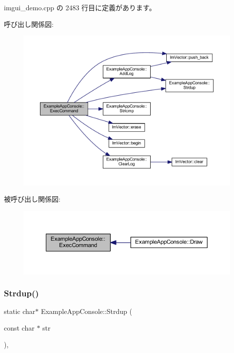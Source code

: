  imgui\+\_\+demo.\+cpp の 2483 行目に定義があります。

呼び出し関係図\+:\nopagebreak
\begin{figure}[H]
\begin{center}
\leavevmode
\includegraphics[width=350pt]{struct_example_app_console_aa1e8bf1f3795cbc41597e1ff081c6589_cgraph}
\end{center}
\end{figure}
被呼び出し関係図\+:\nopagebreak
\begin{figure}[H]
\begin{center}
\leavevmode
\includegraphics[width=350pt]{struct_example_app_console_aa1e8bf1f3795cbc41597e1ff081c6589_icgraph}
\end{center}
\end{figure}
\mbox{\label{struct_example_app_console_a61d0da41ef31ea8690b23681a1e54dba}} 
\subsubsection{\texorpdfstring{Strdup()}{Strdup()}}
{\footnotesize\ttfamily static char$\ast$ Example\+App\+Console\+::\+Strdup (\begin{DoxyParamCaption}\item[{const char $\ast$}]{str }\end{DoxyParamCaption})\hspace{0.3cm}{\ttfamily [inline]}, {\ttfamily [static]}}



